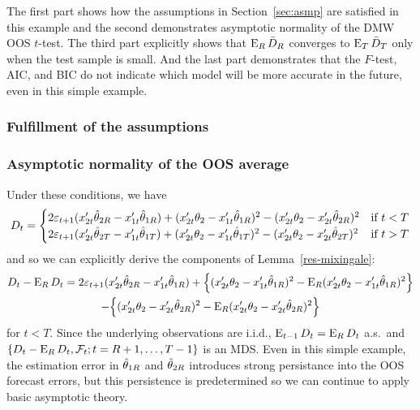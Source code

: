 \documentclass[12pt]{article}
\begin{document}
The first part shows how the assumptions in Section~\ref{sec:asmp} are
satisfied in this example and the second demonstrates asymptotic
normality of the DMW OOS $t$-test. The third part explicitly shows
that $\operatorname{E}_R \bar{D}_{R}$ converges to $\operatorname{E}_T \bar{D}_{T}$ only when the test sample
is small. And the last part demonstrates that the $F$-test, AIC, and
BIC do not indicate which model will be more accurate in the future,
even in this simple example.

\subsubsection*{Fulfillment of the assumptions}

\subsubsection*{Asymptotic normality of the OOS average}

Under these conditions, we have
\begin{equation}
  D_t =
  \begin{cases}
    2 \varepsilon_{t+1} (x_{2t}'\hat\theta_{2R} - x_{1t}'\hat\theta_{1R})
    + (x_{2t}'\theta_2 - x_{1t}'\hat\theta_{1R})^2
    - (x_{2t}'\theta_2 - x_{2t}'\hat\theta_{2R})^2
    & \text{if } t < T \\
    2 \varepsilon_{t+1} (x_{2t}'\hat\theta_{2T} - x_{1t}'\hat\theta_{1T})
    + (x_{2t}'\theta_2 - x_{1t}'\hat\theta_{1T})^2
    - (x_{2t}'\theta_2 - x_{2t}'\hat\theta_{2T})^2
    & \text{if } t > T
  \end{cases}
\end{equation}
and so we can explicitly derive the components of
Lemma~\ref{res-mixingale}:
\begin{multline}\label{eq:17}
  D_t - \operatorname{E}_R D_t
  = 2 \varepsilon_{t+1} (x_{2t}'\hat\theta_{2R} - x_{1t}'\hat\theta_{1R})
  + \Big\{(x_{2t}'\theta_2 - x_{1t}'\hat\theta_{1R})^2
          - \operatorname{E}_R (x_{2t}'\theta_2 - x_{1t}'\hat\theta_{1R})^2 \Big\} \\
  - \Big\{(x_{2t}'\theta_2 - x_{2t}'\hat\theta_{2R})^2
          - \operatorname{E}_R (x_{2t}'\theta_2 - x_{2t}'\hat\theta_{2R})^2 \Big\}
\end{multline}
for $t < T$. Since the underlying observations are i.i.d., $\operatorname{E}_{t-1}
D_t = \operatorname{E}_R D_t$ a.s.\ and $\{D_t - \operatorname{E}_R D_t, \mathcal{F}_{t};
t=R+1,\dots,T-1\}$ is an MDS. Even in this simple example, the
estimation error in $\hat\theta_{1R}$ and $\hat\theta_{2R}$ introduces strong
persistance into the OOS forecast errors, but this persistence is
predetermined so we can continue to apply basic asymptotic theory.
\end{document}
